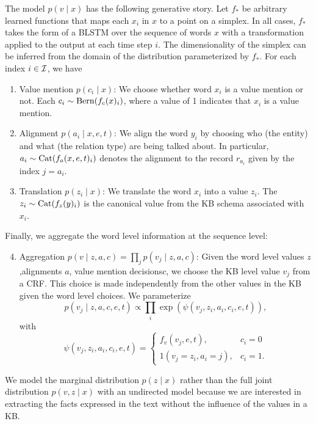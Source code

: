 \documentclass[12pt]{article}
\begin{document}
The model $p(v\mid x)$ has the following generative story.
Let $f_*$ be arbitrary learned functions that maps each $x_i$ in $x$ to
a point on a simplex.
In all cases, $f_*$ takes the form of a BLSTM over the sequence of words $x$
with a transformation applied to the output at each time step $i$.
The dimensionality of the simplex can be inferred from the domain of the
distribution parameterized by $f_*$.
For each index $i \in \mathcal{I}$, we have
\begin{enumerate}
\item Value mention $p(c_i \mid x)$: We choose whether word $x_i$
   is a value mention or not. Each $c_i \sim \mathrm{Bern}(f_c(x)_i)$, where a value of 1 indicates
   that $x_i$ is a value mention.
\item Alignment $p(a_i \mid x,e,t)$: We align the word $y_i$ by choosing who (the entity)
    and what (the relation type) are being talked about.
    In particular, $a_i\sim\mathrm{Cat}(f_a(x,e,t)_i)$ denotes the alignment to the record $r_{a_i}$
    given by the index $j = a_i$. 
\item Translation $p(z_i \mid x)$: We translate the word $x_i$ into a value $z_i$.
    The $z_i \sim \mathrm{Cat}(f_z(y)_i)$ is the canonical value from the KB schema 
    associated with $x_i$.
\end{enumerate}

Finally, we aggregate the word level information at the sequence level:
\begin{enumerate}
\setcounter{enumi}{3}
\item Aggregation $p(v \mid z,a,c) = \prod_j p(v_j \mid z,a,c)$:
    Given the word level values $z$,alignments $a$, value mention decisions$c$,
    we choose the KB level value $v_j$ from a CRF.
    This choice is made independently from the other values in the KB
    given the word level choices.
    We parameterize
    $$p(v_j \mid z,a,c,e,t) \propto \prod_i \exp(\psi(v_j, z_i, a_i, c_i,e,t)),$$
    with
    $$
    \psi(v_j, z_i, a_i, c_i,e,t) = \begin{cases}
    f_v(v_j,e,t), & c_i = 0 \\
    1(v_j = z_i, a_i = j), & c_i = 1.
    \end{cases}
    $$
\end{enumerate}

We model the marginal distribution $p(z \mid x)$ rather than
the full joint distribution $p(v,z\mid x)$ with an undirected model
because we are interested in extracting the facts expressed in the text
without the influence of the values in a KB.
\end{document}
